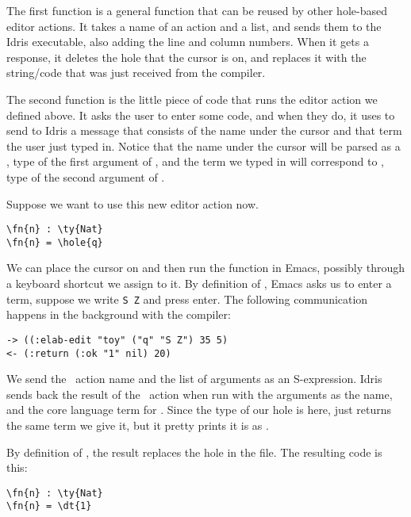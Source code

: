 The first function  is a general function that can be
reused by other hole-based editor actions. It takes a name of an action and a
list, and sends them to the Idris executable, also adding the line and column
numbers. When it gets a response, it deletes the hole that the cursor is on,
and replaces it with the string/code that was just received from the compiler.

The second function  is the little piece of code that runs the
 editor action we defined above. It asks the user to enter some code,
and when they do, it uses  to send to Idris a message
that consists of the name under the cursor and that term the user just typed
in. Notice that the name under the cursor will be parsed as a , type
of the first argument of , and the term we typed in will correspond to
\TT, type of the second argument of .

Suppose we want to use this new editor action now.

\begin{Verbatim}[framesep=2mm, label=\footnotesize{\normalfont{Idris}}, labelposition=topline]
\fn{n} : \ty{Nat}
\fn{n} = \hole{q}
\end{Verbatim}

We can place the cursor on  and then run the  function in
Emacs, possibly through a keyboard shortcut we assign to it.
By definition of , Emacs asks us to enter a term, suppose we
write \texttt{S Z} and press enter.
The following communication happens in the background with the compiler:

\begin{Verbatim}[framesep=2mm, label=\footnotesize{\normalfont{S-expression}}, labelposition=topline]
-> ((:elab-edit "toy" ("q" "S Z") 35 5)
<- (:return (:ok "1" nil) 20)
\end{Verbatim}

We send the \Elab\ action name  and the list of arguments as an
S-expression. Idris sends back the result of the \Elab\ action when run with
the arguments  as the name, and the core language term for .
Since the type of our hole is  here,  just returns the same
term we give it, but it pretty prints it is as .

By definition of , the result  replaces the hole
 in the file. The resulting code is this:

\begin{Verbatim}[framesep=2mm, label=\footnotesize{\normalfont{Idris}}, labelposition=topline]
\fn{n} : \ty{Nat}
\fn{n} = \dt{1}
\end{Verbatim}

